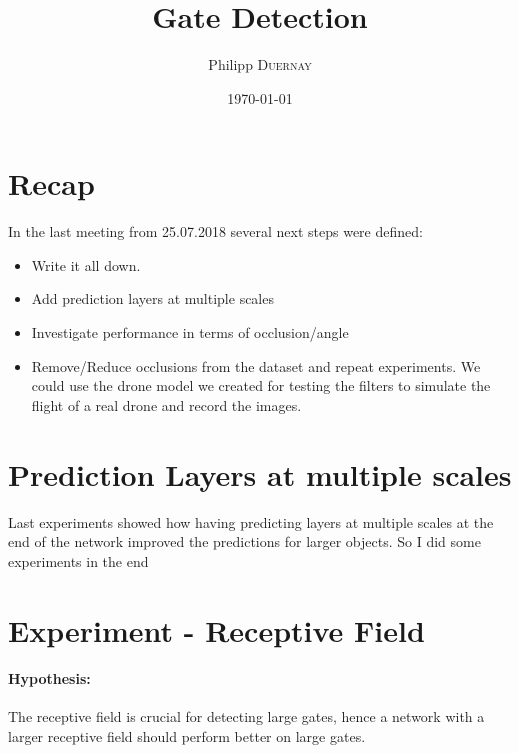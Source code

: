 \documentclass{article}
\title{Gate Detection} %
\author{Philipp \textsc{Duernay}} %
\date{\today} %
\begin{document}
\maketitle


\section{Recap}
In the last meeting from 25.07.2018 several next steps were defined:
\begin{itemize}
	\item Write it all down.
	\item Add prediction layers at multiple scales
	\item Investigate performance in terms of occlusion/angle
	\item Remove/Reduce occlusions from the dataset and repeat experiments. We could use the drone model we created for testing the filters to simulate the flight of a real drone and record the images.
	
\end{itemize}

\section{Prediction Layers at multiple scales}

Last experiments showed how having predicting layers at multiple scales at the end of the network improved the predictions for larger objects. So I did some experiments in the end



\section{Experiment - Receptive Field}

\paragraph{Hypothesis:} The receptive field is crucial for detecting large gates, hence a network with a larger receptive field should perform better on large gates.
\end{document}
